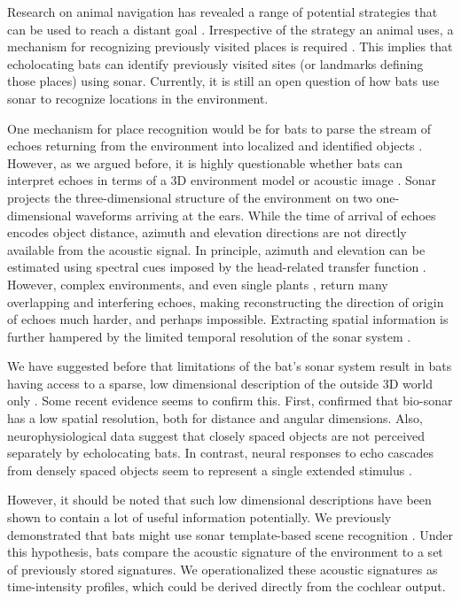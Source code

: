 \documentclass[preprint,5p]{elsarticle}
\begin{document}
Research on animal navigation has revealed a range of potential strategies that can be used to reach a distant goal \citep[Reviewed by][]{Franz2000}. Irrespective of the strategy an animal uses, a mechanism for recognizing previously visited places is required \citep{Vanderelst2016,Vanderelst2017}. This implies that echolocating bats can identify previously visited sites (or landmarks defining those places) using sonar. Currently, it is still an open question of how bats use sonar to recognize locations in the environment.

One mechanism for place recognition would be for bats to parse the stream of echoes returning from the environment into localized and identified objects \citep{Lee2017,Barchi2013,Moss2001,Schnitzler2003,Simmons2012,Ulanovsky2008,Clare2015,Surlykke2016,Geipel2013}. However, as we argued before, it is highly questionable whether bats can interpret echoes in terms of a 3D environment model or acoustic image \citep[e.g.,][]{Vanderelst2015,Vanderelst2016,Steckel2013}. Sonar projects the three-dimensional structure of the environment on two one-dimensional waveforms arriving at the ears. While the time of arrival of echoes encodes object distance, azimuth and elevation directions are not directly available from the acoustic signal. In principle, azimuth and elevation can be estimated using spectral cues imposed by the head-related transfer function \citep[e.g.,][]{Reijniers2010,Aytekin2004}. However, complex environments, and even single plants \citep{Yovel2008,Muller2000}, return many overlapping and interfering echoes, making reconstructing the direction of origin of echoes much harder, and perhaps impossible. Extracting spatial information is further hampered by the limited temporal resolution of the sonar system \citep{Simmons1989,Wiegrebe1996,Surlykke1996}. 

We have suggested before that limitations of the bat's sonar system result in bats having access to a sparse, low dimensional description of the outside 3D world only \citep{Vanderelst2015a,Vanderelst2016}. Some recent evidence seems to confirm this. First, \citet{Geberl2019} confirmed that bio-sonar has a low spatial resolution, both for distance and angular dimensions. Also, neurophysiological data suggest that closely spaced objects are not perceived separately by echolocating bats. In contrast, neural responses to echo cascades from densely spaced objects seem to represent a single extended stimulus \citep{Warnecke2018,Knowles2015}.

However, it should be noted that such low dimensional descriptions have been shown to contain a lot of useful information \citep{Kuc1997b,Kuc1997} potentially. We previously demonstrated that bats might use sonar template-based scene recognition \citep{Vanderelst2016,Vanderelst2017}. Under this hypothesis, bats compare the acoustic signature of the environment to a set of previously stored signatures. We operationalized these acoustic signatures as time-intensity profiles, which could be derived directly from the cochlear output.
\end{document}
